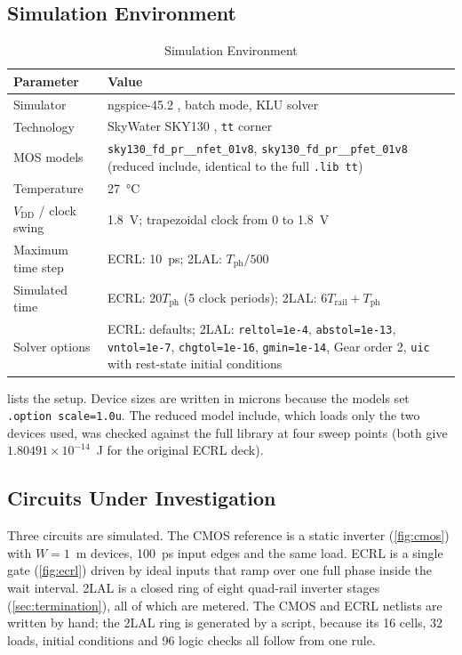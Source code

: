 \documentclass[conference]{IEEEtran}
\newcommand{\VDD}{V_{\mathrm{DD}}}
\newcommand{\Tph}{T_{\mathrm{ph}}}
\begin{document}
\subsection{Simulation Environment}
\begin{table}[!t]
\caption{Simulation Environment}
\label{tab:env}
\centering
\begin{tabular}{@{}lL{0.62\columnwidth}@{}}
\toprule
\textbf{Parameter} & \textbf{Value} \\
\midrule
Simulator            & ngspice-45.2 \cite{ngspice,nagel1975}, batch mode, KLU solver \\
Technology           & SkyWater SKY130 \cite{skywater}, \texttt{tt} corner \\
MOS models           & \texttt{sky130\_fd\_pr\_\_nfet\_01v8}, \texttt{sky130\_fd\_pr\_\_pfet\_01v8} (reduced include, identical to the full \texttt{.lib tt}) \\
Temperature          & 27~\si{\celsius} \\
$\VDD$ / clock swing & 1.8~V; trapezoidal clock from 0 to 1.8~V \\
Maximum time step    & ECRL: 10~ps; 2LAL: $\Tph/500$ \\
Simulated time       & ECRL: $20\Tph$ (5 clock periods); 2LAL: $6T_{\mathrm{rail}}+\Tph$ \\
Solver options       & ECRL: defaults; 2LAL: \texttt{reltol=1e-4}, \texttt{abstol=1e-13}, \texttt{vntol=1e-7}, \texttt{chgtol=1e-16}, \texttt{gmin=1e-14}, Gear order 2, \texttt{uic} with rest-state initial conditions \\
\bottomrule
\end{tabular}
\end{table}
 lists the setup. Device sizes are written in microns because
the models set \texttt{.option scale=1.0u}. The reduced model include, which
loads only the two devices used, was checked against the full library at
four sweep points (both give $1.80491\times10^{-14}$~J for the original ECRL
deck).

\subsection{Circuits Under Investigation}
Three circuits are simulated. The CMOS reference is a static inverter
(\cref{fig:cmos}) with $W=1$~\textmu m devices, 100~ps input edges and the
same load. ECRL is a single gate (\cref{fig:ecrl}) driven by ideal inputs that
ramp over one full phase inside the wait interval. 2LAL is a closed ring of
eight quad-rail inverter stages (\cref{sec:termination}), all of which are
metered. The CMOS and ECRL netlists are written by hand; the 2LAL ring is
generated by a script, because its 16 cells, 32 loads, initial conditions
and 96 logic checks all follow from one rule.
\end{document}
